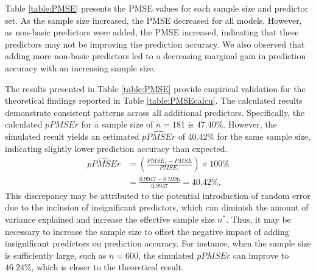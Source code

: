 Table \ref{table:PMSE} presents the PMSE values for each sample size and predictor set. As the sample size increased, the PMSE decreased for all models. However, as non-basic predictors were added, the PMSE increased, indicating that these predictors may not be improving the prediction accuracy. We also observed that adding more non-basic predictors led to a decreasing marginal gain in prediction accuracy with an increasing sample size.

The results presented in Table \ref{table:PMSE} provide empirical validation for the theoretical findings reported in Table \ref{table:PMSEcalcu}. The calculated results demonstrate consistent patterns across all additional predictors. Specifically, the calculated $pPMSEr$ for a sample size of $n=181$ is $47.40\%$. However, the simulated result yields an estimated $\hat{pPMSEr}$ of $40.42\%$ for the same sample size, indicating slightly lower prediction accuracy than expected. 
$$\begin{aligned}
\hat{pPMSEr} &= \left(\frac{PMSE_1 - PMSE}{PMSE_1} \right)\times 100\%\\
&= \frac{0.9947-0.5926}{0.9947}= 40.42\%,
\end{aligned}$$  
This discrepancy may be attributed to the potential introduction of random error due to the inclusion of insignificant predictors, which can diminish the amount of variance explained and increase the effective sample size $n^*$. Thus, it may be necessary to increase the sample size to offset the negative impact of adding insignificant predictors on prediction accuracy. For instance, when the sample size is sufficiently large, such as $n=600$, the simulated $pPMSEr$ can improve to $46.24\%$, which is closer to the theoretical result.

